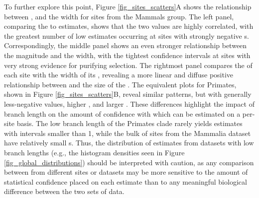 To further explore this point, Figure \ref{fig_sites_scatters}A shows
the relationship between \slrt, \omgml and the \ci width for sites
from the Mammals group. The left panel, comparing the \slrt to \nz
\omgml estimates, shows that the two values are highly correlated,
with the greatest number of low \omgml estimates occurring at sites
with strongly negative \slrt{}s. Correspondingly, the middle panel
shows an even stronger relationship between the \slrt magnitude and
the \ci width, with the tightest confidence intervals at sites with
very strong evidence for purifying selection. The rightmost panel
compares the \omgml of each site with the width of its \ci, revealing
a more linear and diffuse positive relationship between \omgml and the
size of the \ci. The equivalent plots for Primates, shown in Figure
\ref{fig_sites_scatters}B, reveal similar patterns, but with generally
less-negative \slrt values, higher \omgml, and larger \ci. These
differences highlight the impact of branch length on the amount of
confidence with which \omg can be estimated on a per-site basis. The
low branch length of the Primates clade rarely yields \omgml estimates
with \ci intervals smaller than 1, while the bulk of sites from the
Mammalia dataset have relatively small \ci{}s. Thus, the distribution
of \omgml estimates from datasets with low branch lengths (e.g., the
histogram densities seen in Figure \ref{fig_global_distributions})
should be interpreted with caution, as any comparison between \omgml
from different sites or datasets may be more sensitive to the amount
of statistical confidence placed on each estimate than to any
meaningful biological difference between the two sets of data.


